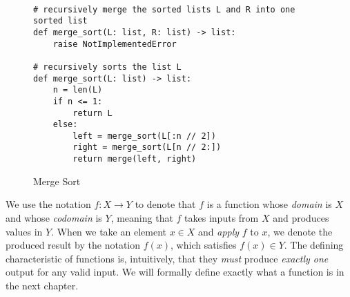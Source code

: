 \begin{definition}
    ~

\begin{center}
\begin{minipage}{.5\linewidth}
\begin{figure}[H]
\renewcommand\figurename{Algorithm}
\begin{verbatim}
# recursively merge the sorted lists L and R into one sorted list
def merge_sort(L: list, R: list) -> list:
    raise NotImplementedError

# recursively sorts the list L
def merge_sort(L: list) -> list:
    n = len(L)
    if n <= 1:
        return L
    else:
        left = merge_sort(L[:n // 2])
        right = merge_sort(L[n // 2:])
        return merge(left, right)
\end{verbatim}
\caption{Merge Sort}\label{alg:mergesort}
\end{figure}
\end{minipage}
\end{center}

\end{definition}

\begin{intuition}[Function]
    We use the notation $f: X \to Y$ to denote that $f$ is a function
    whose \emph{domain} is $X$ and whose \emph{codomain} is $Y$,
    meaning that $f$ takes inputs from $X$ and produces values in $Y$.
    When we take an element $x \in X$ and \emph{apply} $f$ to $x$,
    we denote the produced result by the notation $f(x)$, which satisfies $f(x) \in Y$.
    The defining characteristic of functions is, intuitively,
    that they \emph{must} produce \emph{exactly one} output for any valid input.
    We will formally define exactly what a function is in the next chapter.
\end{intuition}


